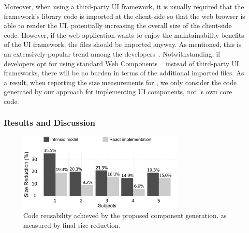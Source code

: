 Moreover, when using a third-party UI framework,
it is usually required that the framework's \javascript library code is imported at the client-side
so that the web browser is able to render the UI,
potentially increasing the overall size of the client-side code.
However, if the web application wants to enjoy
the maintainability benefits of the UI framework,
the \javascript files should be imported anyway.
As mentioned, this is an extensively-popular trend 
among the developers~\cite{StateOfJS:WebPlatformTests, StackOverflow:2017:Survey}.
Notwithstanding, if developers opt for using standard \html Web Components ~\cite{MDN:2017:WebComponents}
instead of third-party UI frameworks,
there will be no burden in terms of the additional imported \javascript files.
As a result, when reporting the size measurements for \react,
we only consider the code generated by our approach for implementing UI components,
not \react's own core \javascript code.


\subsubsection{Results and Discussion}

\begin{figure}
    \centering
    \includegraphics[width=0.75\textwidth]{maintainability/figures/size-reduction}
    \caption{Code reusability achieved by the proposed component generation, as measured by final size reduction.}
    
    \label{fig:size-reduction-results}
\end{figure} 

